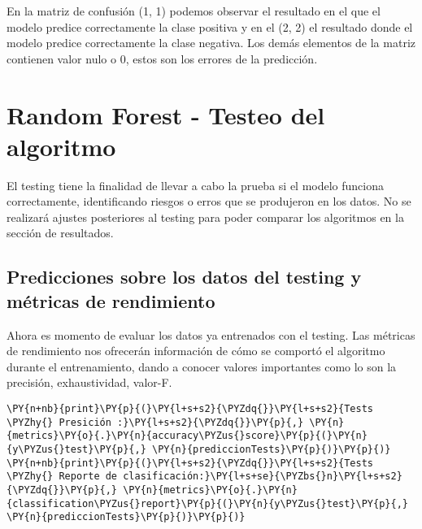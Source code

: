     En la matriz de confusión (1, 1) podemos observar el resultado en el que
el modelo predice correctamente la clase positiva y en el (2, 2) el
resultado donde el modelo predice correctamente la clase negativa. Los
demás elementos de la matriz contienen valor nulo o 0, estos son los
errores de la predicción.

    \hypertarget{random-forest---testeo-del-algoritmo}{%
\section{Random Forest - Testeo del
algoritmo}\label{random-forest---testeo-del-algoritmo}}

El testing tiene la finalidad de llevar a cabo la prueba si el modelo
funciona correctamente, identificando riesgos o erros que se produjeron
en los datos. No se realizará ajustes posteriores al testing para poder
comparar los algoritmos en la sección de resultados.

    \hypertarget{predicciones-sobre-los-datos-del-testing-y-muxe9tricas-de-rendimiento}{%
\subsection{Predicciones sobre los datos del testing y métricas de
rendimiento}\label{predicciones-sobre-los-datos-del-testing-y-muxe9tricas-de-rendimiento}}

Ahora es momento de evaluar los datos ya entrenados con el testing. Las
métricas de rendimiento nos ofrecerán información de cómo se comportó el
algoritmo durante el entrenamiento, dando a conocer valores importantes
como lo son la precisión, exhaustividad, valor-F.

    \begin{tcolorbox}[breakable, size=fbox, boxrule=1pt, pad at break*=1mm,colback=cellbackground, colframe=cellborder]
\begin{Verbatim}[commandchars=\\\{\}]
\PY{n+nb}{print}\PY{p}{(}\PY{l+s+s2}{\PYZdq{}}\PY{l+s+s2}{Tests \PYZhy{} Presición :}\PY{l+s+s2}{\PYZdq{}}\PY{p}{,} \PY{n}{metrics}\PY{o}{.}\PY{n}{accuracy\PYZus{}score}\PY{p}{(}\PY{n}{y\PYZus{}test}\PY{p}{,} \PY{n}{prediccionTests}\PY{p}{)}\PY{p}{)}
\PY{n+nb}{print}\PY{p}{(}\PY{l+s+s2}{\PYZdq{}}\PY{l+s+s2}{Tests \PYZhy{} Reporte de clasificación:}\PY{l+s+se}{\PYZbs{}n}\PY{l+s+s2}{\PYZdq{}}\PY{p}{,} \PY{n}{metrics}\PY{o}{.}\PY{n}{classification\PYZus{}report}\PY{p}{(}\PY{n}{y\PYZus{}test}\PY{p}{,} \PY{n}{prediccionTests}\PY{p}{)}\PY{p}{)}
\end{Verbatim}
\end{tcolorbox}


